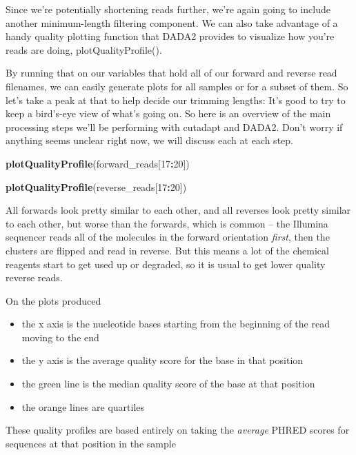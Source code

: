 \documentclass[
]{book}
\newenvironment{Shaded}{\begin{snugshade}}{\end{snugshade}}
\newcommand{\DecValTok}[1]{\textcolor[rgb]{0.00,0.00,0.81}{#1}}
\newcommand{\FunctionTok}[1]{\textcolor[rgb]{0.13,0.29,0.53}{\textbf{#1}}}
\newcommand{\NormalTok}[1]{#1}
\newcommand{\SpecialCharTok}[1]{\textcolor[rgb]{0.81,0.36,0.00}{\textbf{#1}}}
\begin{document}
Since we're potentially shortening reads further, we're again going to include another minimum-length filtering component. We can also take advantage of a handy quality plotting function that DADA2 provides to visualize how you're reads are doing, plotQualityProfile().

By running that on our variables that hold all of our forward and reverse read filenames, we can easily generate plots for all samples or for a subset of them. So let's take a peak at that to help decide our trimming lengths: It's good to try to keep a bird's-eye view of what's going on. So here is an overview of the main processing steps we'll be performing with cutadapt and DADA2. Don't worry if anything seems unclear right now, we will discuss each at each step.

\begin{Shaded}
\begin{Highlighting}[]
    \FunctionTok{plotQualityProfile}\NormalTok{(forward\_reads[}\DecValTok{17}\SpecialCharTok{:}\DecValTok{20}\NormalTok{])}

    \FunctionTok{plotQualityProfile}\NormalTok{(reverse\_reads[}\DecValTok{17}\SpecialCharTok{:}\DecValTok{20}\NormalTok{])}
\end{Highlighting}
\end{Shaded}

All forwards look pretty similar to each other, and all reverses look pretty similar to each other, but worse than the forwards, which is common --
the Illumina sequencer reads all of the molecules in the forward orientation \emph{first}, then the clusters are flipped and read in reverse. But this means a lot of the chemical reagents start to get used up or degraded, so it is usual to get lower quality reverse reads.

On the plots produced

\begin{itemize}
\item
  the x axis is the nucleotide bases starting from the beginning of the read moving to the end
\item
  the y axis is the average quality score for the base in that position
\item
  the green line is the median quality score of the base at that position
\item
  the orange lines are quartiles
\end{itemize}

These quality profiles are based entirely on taking the \emph{average} PHRED scores for sequences at that position in the sample
\end{document}
